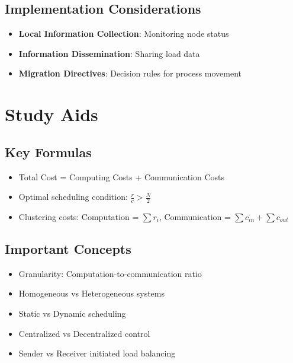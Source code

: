 \documentclass[12pt]{article}
\begin{document}
\subsection{Implementation Considerations}
\begin{itemize}
\item \textbf{Local Information Collection}: Monitoring node status
\item \textbf{Information Dissemination}: Sharing load data
\item \textbf{Migration Directives}: Decision rules for process movement
\end{itemize}

\section*{Study Aids}

\subsection*{Key Formulas}
\begin{itemize}
\item Total Cost = Computing Costs + Communication Costs
\item Optimal scheduling condition: $\frac{r}{c} > \frac{N}{2}$
\item Clustering costs: Computation = $\sum r_i$, Communication = $\sum c_{in} + \sum c_{out}$
\end{itemize}

\subsection*{Important Concepts}
\begin{itemize}
\item Granularity: Computation-to-communication ratio
\item Homogeneous vs Heterogeneous systems
\item Static vs Dynamic scheduling
\item Centralized vs Decentralized control
\item Sender vs Receiver initiated load balancing
\end{itemize}
\end{document}
